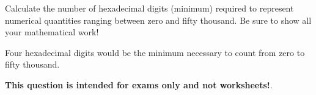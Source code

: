 

Calculate the number of hexadecimal digits (minimum) required to represent numerical quantities ranging between zero and fifty thousand.  Be sure to show all your mathematical work!

\vskip 30pt







Four hexadecimal digits would be the minimum necessary to count from zero to fifty thousand. 







{\bf This question is intended for exams only and not worksheets!}.




